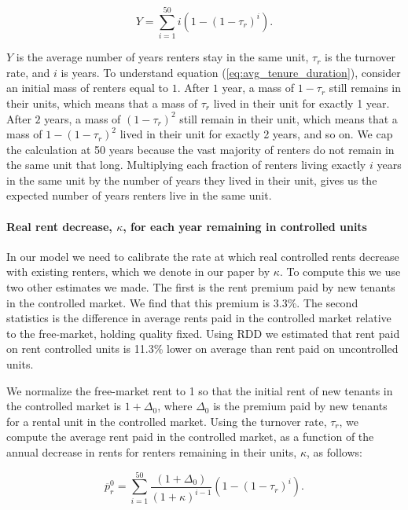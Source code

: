 \documentclass[parskip=full]{article}
\begin{document}
\begin{equation}\label{eq:avg_tenure_duration}
    Y=\sum_{i=1}^{50}i(1-(1-\tau_{r})^{i}).
\end{equation}

\noindent $Y$ is the average number of years renters stay in the same unit, $\tau_{r}$ is the turnover rate, and $i$ is years. To understand equation (\ref{eq:avg_tenure_duration}), consider an initial mass of renters equal to $1$. After $1$ year, a mass of $1-\tau_{r}$ still remains in their units, which means that a mass of $\tau_{r}$ lived in their unit for exactly 1 year. After $2$ years, a mass of $(1-\tau_{r})^2$ still remain in their unit, which means that a mass of $1-(1-\tau_{r})^2$ lived in their unit for exactly 2 years, and so on. We cap the calculation at 50 years because the vast majority of renters do not remain in the same unit that long. Multiplying each fraction of renters living exactly $i$ years in the same unit by the number of years they lived in their unit, gives us the expected number of years renters live in the same unit.

\paragraph{Real rent decrease, $\kappa$, for each year remaining in controlled units}

In our model we need to calibrate the rate at which real controlled rents decrease  with existing renters, which we denote in our paper by $\kappa$. To compute this we use two other estimates we made. The first is the rent premium paid by new tenants in the controlled market. We find that this premium is 3.3\%. The second statistics is the difference in average rents paid in the controlled market relative to the free-market, holding quality fixed. Using RDD we estimated that rent paid on rent controlled units is 11.3\% lower on average than rent paid on uncontrolled units. 

We normalize the free-market rent to 1 so that the initial rent of new tenants in the controlled market is $1+\Delta_{0}$, where $\Delta_{0}$ is the premium paid by new tenants for a rental unit in the controlled market. Using the turnover rate, $\tau_{r}$, we compute the average rent paid in the controlled market, as a function of the annual decrease in rents for renters remaining in their units, $\kappa$, as follows:

\begin{equation}\label{eq:computing_annual_decrease}
    \overline{p}^{0}_{r}=\sum_{i=1}^{50}\frac{(1+\Delta_{0})}{(1+\kappa)^{i-1}}(1-(1-\tau_{r})^{i}).
\end{equation}
\end{document}
